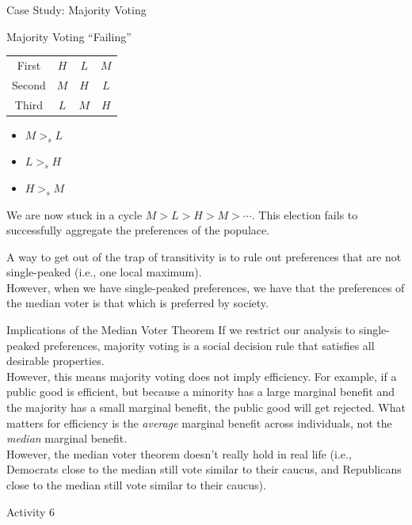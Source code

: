 \documentclass[10pt]{extarticle}
\begin{document}
\begin{problem}{Case Study: Majority Voting}
\begin{problem}{Majority Voting ``Failing''}
\begin{center}
\begin{tabular}{c|c|c|c|}
          \cline{2-4}
          First & $H$ & $L$ & $M$\\
          \cline{2-4}
          Second & $M$ & $H$ & $L$\\
          \cline{2-4}
          Third & $L$ & $M$ & $H$\\
          \cline{2-4}
        \end{tabular}
      \end{center}
      \begin{itemize}
        \item $M >_s L$
        \item $L >_s H$
        \item $H >_s M$
      \end{itemize}
      We are now stuck in a cycle $M>L>H>M>\cdots$. This election fails to successfully aggregate the preferences of the populace.
    \end{problem}
    A way to get out of the trap of transitivity is to rule out preferences that are not single-peaked (i.e., one local maximum).\\

    However, when we have single-peaked preferences, we have that the preferences of the median voter is that which is preferred by society.
  \end{problem}
  \begin{problem}{Implications of the Median Voter Theorem}
    If we restrict our analysis to single-peaked preferences, majority voting is a social decision rule that satisfies all desirable properties.\\

    However, this means majority voting does not imply efficiency. For example, if a public good is efficient, but because a minority has a large marginal benefit and the majority has a small marginal benefit, the public good will get rejected. What matters for efficiency is the \textit{average} marginal benefit across individuals, not the \textit{median} marginal benefit.\\

    However, the median voter theorem doesn't really hold in real life (i.e., Democrats close to the median still vote similar to their caucus, and Republicans close to the median still vote similar to their caucus).
  \end{problem}
  \begin{problem}{Activity 6}
    \begin{tcbraster}[raster columns = 1,colframe = black!75!white,colback=white]
    \end{tcbraster}
  \end{problem}
\end{document}
